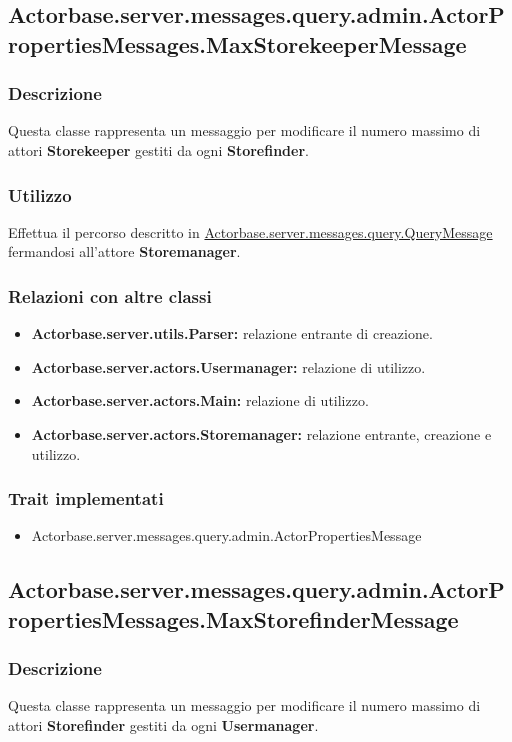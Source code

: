 \documentclass[a4paper]{article}
\begin{document}
		\subsection{Actorbase.server.messages.query.admin.ActorPropertiesMessages.MaxStorekeeperMessage}
			\subsubsection{Descrizione}
				Questa classe rappresenta un messaggio per modificare il numero massimo di attori \textbf{Storekeeper} gestiti da ogni \textbf{Storefinder}.
				
			\subsubsection{Utilizzo}
				Effettua il percorso descritto in \hyperref[QueryMessage]{Actorbase.server.messages.query.QueryMessage} fermandosi all'attore 
				\textbf{Storemanager}.
				
			\subsubsection{Relazioni con altre classi}
				\begin{itemize}
					\item \textbf{Actorbase.server.utils.Parser:} relazione entrante di creazione.
					\item \textbf{Actorbase.server.actors.Usermanager:} relazione di utilizzo.
					\item \textbf{Actorbase.server.actors.Main:} relazione di utilizzo.
					\item \textbf{Actorbase.server.actors.Storemanager:} relazione entrante, creazione e utilizzo.
				\end{itemize}
			\subsubsection{Trait implementati}
				\begin{itemize}
					\item Actorbase.server.messages.query.admin.ActorPropertiesMessage
				\end{itemize}
				
		\subsection{Actorbase.server.messages.query.admin.ActorPropertiesMessages.MaxStorefinderMessage}
			\subsubsection{Descrizione}
				Questa classe rappresenta un messaggio per modificare il numero massimo di attori \textbf{Storefinder} gestiti da ogni \textbf{Usermanager}.
				
\end{document}

